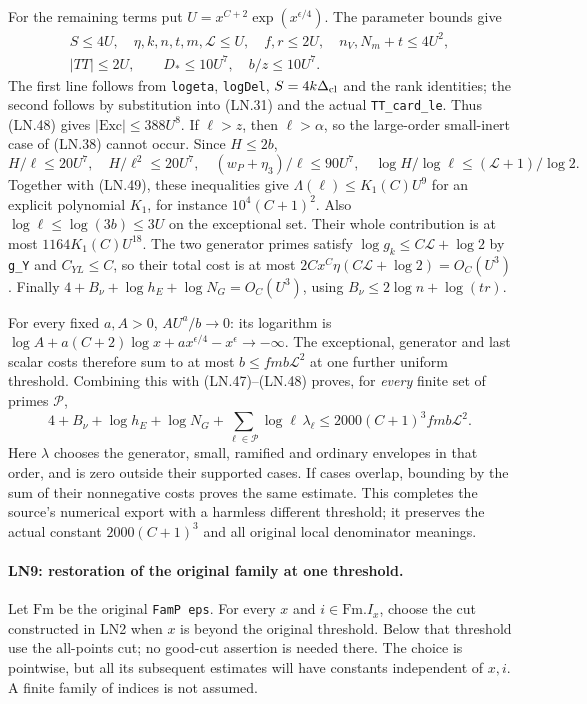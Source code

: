 For the remaining terms put
$U=x^{C+2}\exp(x^{\epsilon/4})$.  The parameter bounds give
\[
 \begin{gathered}
 S\le4U,\quad \eta,k,n,t,m,\mathcal L\le U,\quad
 f,r\le2U,\quad n_V,N_m+t\le4U^2,\\
 |TT|\le2U,\qquad D_*\le10U^7,\quad b/z\le10U^7.
 \end{gathered}                                                   \tag{LN.49}
\]
The first line follows from \texttt{logeta}, \texttt{logDel},
$S=4k\Delta_{\rm cl}$ and the rank identities; the second follows
by substitution into (LN.31) and the actual \texttt{TT\_card\_le}.
Thus (LN.48) gives $|\mathrm{Exc}|\le388U^8$.
If $\ell>z$, then $\ell>\alpha$, so the large-order small-inert
case of (LN.38) cannot occur.  Since $H\le2b$,
\[
 H/\ell\le20U^7,\quad
 H/\ell^2\le20U^7,\quad
 (w_P+\eta_3)/\ell\le90U^7,\quad
 \log H/\log\ell\le(\mathcal L+1)/\log2.
 \tag{LN.50}
\]
Together with (LN.49), these inequalities give
$\Lambda(\ell)\le K_1(C)U^9$ for an explicit polynomial
$K_1$, for instance $10^4(C+1)^2$.  Also
$\log\ell\le\log(3b)\le3U$ on the exceptional set.
Their whole contribution is at most
$1164K_1(C)U^{18}$.
The two generator primes satisfy
$\log g_k\le C\mathcal L+\log2$ by \texttt{g\_Y} and
$C_{YL}\le C$, so their total cost is at most
$2Cx^C\eta(C\mathcal L+\log2)=O_C(U^3)$.
Finally $4+B_\nu+\log h_E+\log N_G=O_C(U^3)$, using
$B_\nu\le2\log n+\log(tr)$.

For every fixed $a,A>0$, $A U^a/b\to0$: its logarithm is
$\log A+a(C+2)\log x+a x^{\epsilon/4}-x^\epsilon\to-\infty$.
The exceptional, generator and last scalar costs therefore sum to
at most $b\le fmb\mathcal L^2$ at one further uniform threshold.
Combining this with (LN.47)--(LN.48) proves, for \emph{every} finite
set of primes $\mathcal P$,
\[
 4+B_\nu+\log h_E+\log N_G+
        \sum_{\ell\in\mathcal P}\log\ell\,\lambda_\ell
       \le 2000(C+1)^3 fmb\mathcal L^2.               \tag{LN.51}
\]
Here $\lambda$ chooses the generator, small, ramified and ordinary
envelopes in that order, and is zero outside their supported cases.
If cases overlap, bounding by the sum of their nonnegative costs
proves the same estimate.  This completes the source's numerical
export with a harmless different threshold; it preserves the actual
constant $2000(C+1)^3$ and all original local denominator meanings.

\paragraph{LN9: restoration of the original family at one threshold.}
\label{claim:LN9}
Let $\mathrm{Fm}$ be the original \texttt{FamP eps}.  For every
$x$ and $i\in\mathrm{Fm}.I_x$, choose the cut constructed in LN2
when $x$ is beyond the original threshold.  Below that threshold
use the all-points cut; no good-cut assertion is needed there.
The choice is pointwise, but all its subsequent estimates will
have constants independent of $x,i$.  A finite family of indices
is not assumed.


